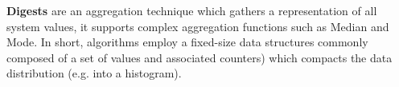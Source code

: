\textbf{Digests} are an aggregation technique which gathers a representation of all system values, it supports complex aggregation functions such as Median and Mode. In short, algorithms employ a fixed-size data structures commonly composed of a set of values and associated counters) which compacts the data distribution (e.g. into a histogram).









